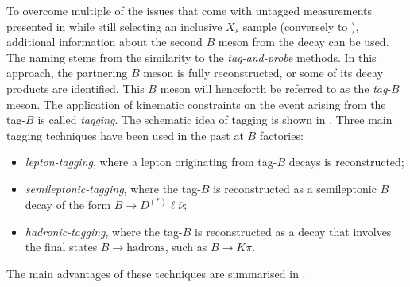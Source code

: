 To overcome multiple of the issues that come with untagged measurements presented in  
while still selecting an inclusive $X_s$ sample (conversely to ), 
additional information about the second $B$ meson from the \FourS decay can be used.
The naming stems from the similarity to the \textit{tag-and-probe} methods.
In this approach, the partnering $B$ meson is fully reconstructed, or some of its decay products are identified.
This $B$ meson will henceforth be referred to as the \textit{tag}-$B$ meson.
The application of kinematic constraints on the event arising from the tag-$B$ is called \textit{tagging}.
The schematic idea of tagging is shown in .
Three main tagging techniques have been used in the past at $B$ factories:
\begin{itemize}
    \item \textit{lepton-tagging}, where a lepton originating from tag-$B$ decays is reconstructed;
    \item \textit{semileptonic-tagging}, where the tag-$B$ is reconstructed as a semileptonic $B$ decay of the form $B\to D^{(*)}\ell\bar{\nu}$;
    \item \textit{hadronic-tagging}, where the tag-$B$ is reconstructed as a decay that involves the final states $B\to\mathrm{hadrons}$, such as $B\to K\pi$.
\end{itemize}
The main advantages of these techniques are summarised in .

